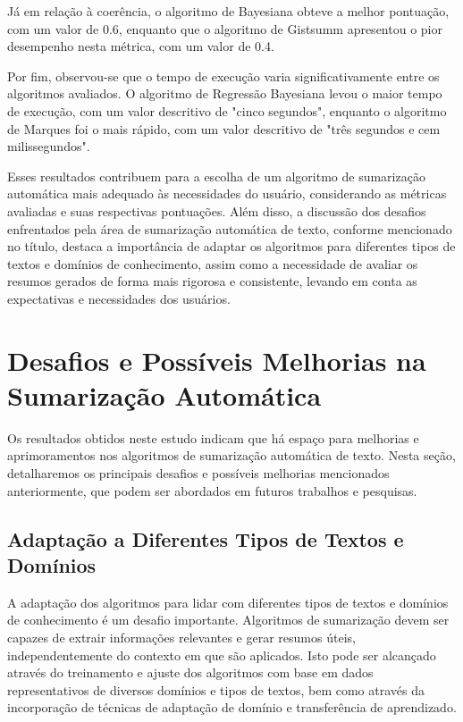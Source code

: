 Já em relação à coerência, o algoritmo de Bayesiana obteve a melhor pontuação, com um valor de 0.6, enquanto que o algoritmo de Gistsumm apresentou o pior desempenho nesta métrica, com um valor de 0.4.

Por fim, observou-se que o tempo de execução varia significativamente entre os algoritmos avaliados. 
O algoritmo de Regressão Bayesiana levou o maior tempo de execução, com um valor descritivo de "cinco 
segundos", enquanto o algoritmo de Marques foi o mais rápido, com um valor descritivo de "três segundos e cem milissegundos".

Esses resultados contribuem para a escolha de um algoritmo de sumarização automática mais adequado 
às necessidades do usuário, considerando as métricas avaliadas e suas respectivas pontuações. Além 
disso, a discussão dos desafios enfrentados pela área de sumarização automática de texto, conforme 
mencionado no título, destaca a importância de adaptar os algoritmos para diferentes tipos de 
textos e domínios de conhecimento, assim como a necessidade de avaliar os resumos gerados de forma 
mais rigorosa e consistente, levando em conta as expectativas e necessidades dos usuários.

\section{Desafios e Possíveis Melhorias na Sumarização Automática}
\label{sec:desafios-melhorias}

Os resultados obtidos neste estudo indicam que há espaço para melhorias e aprimoramentos nos algoritmos de sumarização automática de texto. Nesta seção, detalharemos os principais desafios e possíveis melhorias mencionados anteriormente, que podem ser abordados em futuros trabalhos e pesquisas.

\subsection{Adaptação a Diferentes Tipos de Textos e Domínios}
A adaptação dos algoritmos para lidar com diferentes tipos de textos e domínios de conhecimento é um desafio importante. Algoritmos de sumarização devem ser capazes de extrair informações relevantes e gerar resumos úteis, independentemente do contexto em que são aplicados. Isto pode ser alcançado através do treinamento e ajuste dos algoritmos com base em dados representativos de diversos domínios e tipos de textos, bem como através da incorporação de técnicas de adaptação de domínio e transferência de aprendizado.

